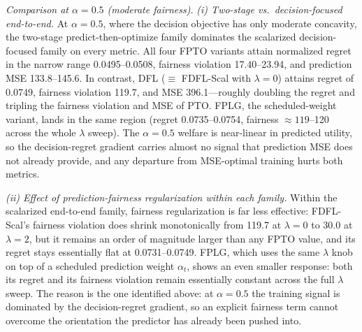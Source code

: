 \documentclass[ijoc,sglanonrev]{informs4}
\begin{document}

\textit{Comparison at $\alpha = 0.5$ (moderate fairness).}
\emph{(i) Two-stage vs.\ decision-focused end-to-end.}
At $\alpha = 0.5$, where the decision objective has only moderate concavity, the two-stage predict-then-optimize family dominates the scalarized decision-focused family on every metric. All four FPTO variants attain normalized regret in the narrow range 0.0495--0.0508, fairness violation 17.40--23.94, and prediction MSE 133.8--145.6. In contrast, DFL ($\equiv$ FDFL-Scal with $\lambda = 0$) attains regret of 0.0749, fairness violation 119.7, and MSE 396.1---roughly doubling the regret and tripling the fairness violation and MSE of PTO. FPLG, the scheduled-weight variant, lands in the same region (regret 0.0735--0.0754, fairness $\approx 119$--120 across the whole $\lambda$ sweep). The $\alpha = 0.5$ welfare is near-linear in predicted utility, so the decision-regret gradient carries almost no signal that prediction MSE does not already provide, and any departure from MSE-optimal training hurts both metrics.

\emph{(ii) Effect of prediction-fairness regularization within each family.}
Within the scalarized end-to-end family, fairness regularization is far less effective: FDFL-Scal's fairness violation does shrink monotonically from 119.7 at $\lambda = 0$ to 30.0 at $\lambda = 2$, but it remains an order of magnitude larger than any FPTO value, and its regret stays essentially flat at 0.0731--0.0749. FPLG, which uses the same $\lambda$ knob on top of a scheduled prediction weight $\alpha_t$, shows an even smaller response: both its regret and its fairness violation remain essentially constant across the full $\lambda$ sweep. The reason is the one identified above: at $\alpha = 0.5$ the training signal is dominated by the decision-regret gradient, so an explicit fairness term cannot overcome the orientation the predictor has already been pushed into.
\end{document}
